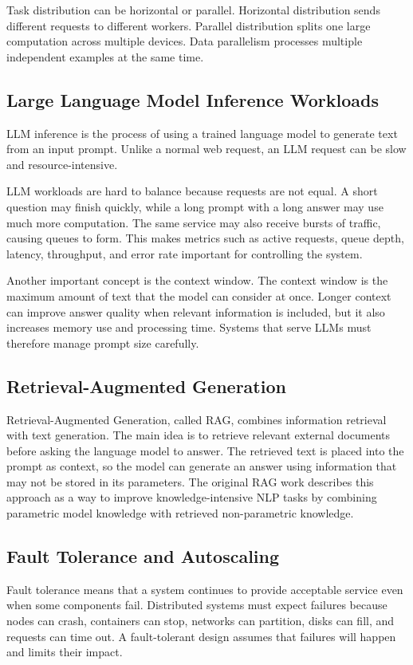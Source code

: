 Task distribution can be horizontal or parallel. Horizontal distribution sends different requests to different workers. Parallel distribution splits one large computation across multiple devices. Data parallelism processes multiple independent examples at the same time.

\subsection{Large Language Model Inference Workloads}
LLM inference is the process of using a trained language model to generate text from an input prompt. Unlike a normal web request, an LLM request can be slow and resource-intensive.

LLM workloads are hard to balance because requests are not equal. A short question may finish quickly, while a long prompt with a long answer may use much more computation. The same service may also receive bursts of traffic, causing queues to form. This makes metrics such as active requests, queue depth, latency, throughput, and error rate important for controlling the system.

Another important concept is the context window. The context window is the maximum amount of text that the model can consider at once. Longer context can improve answer quality when relevant information is included, but it also increases memory use and processing time. Systems that serve LLMs must therefore manage prompt size carefully.

\subsection{Retrieval-Augmented Generation}
Retrieval-Augmented Generation, called RAG, combines information retrieval with text generation. The main idea is to retrieve relevant external documents before asking the language model to answer. The retrieved text is placed into the prompt as context, so the model can generate an answer using information that may not be stored in its parameters. The original RAG work describes this approach as a way to improve knowledge-intensive NLP tasks by combining parametric model knowledge with retrieved non-parametric knowledge.

\subsection{Fault Tolerance and Autoscaling}
Fault tolerance means that a system continues to provide acceptable service even when some components fail. Distributed systems must expect failures because nodes can crash, containers can stop, networks can partition, disks can fill, and requests can time out. A fault-tolerant design assumes that failures will happen and limits their impact.

